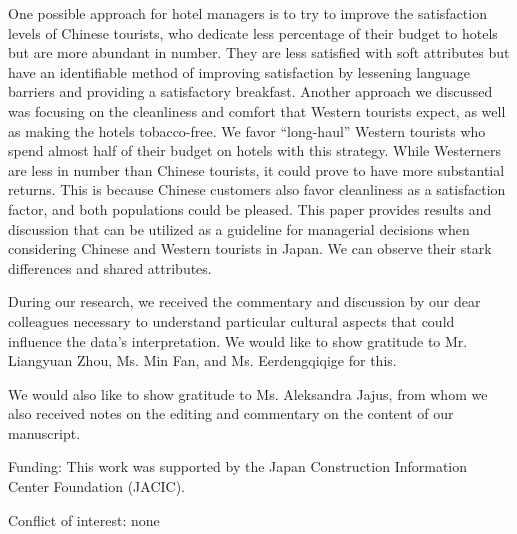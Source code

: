 \documentclass[smallextended,natbib]{svjour3}       %
\begin{document}
  One possible approach for hotel managers is to try to improve the satisfaction levels of Chinese tourists, who dedicate less percentage of their budget to hotels but are more abundant in number. They are less satisfied with soft attributes but have an identifiable method of improving satisfaction by lessening language barriers and providing a satisfactory breakfast. Another approach we discussed was focusing on the cleanliness and comfort that Western tourists expect, as well as making the hotels tobacco-free. We favor ``long-haul'' Western tourists who spend almost half of their budget on hotels with this strategy. While Westerners are less in number than Chinese tourists, it could prove to have more substantial returns. This is because Chinese customers also favor cleanliness as a satisfaction factor, and both populations could be pleased. This paper provides results and discussion that can be utilized as a guideline for managerial decisions when considering Chinese and Western tourists in Japan. We can observe their stark differences and shared attributes. 

\begin{acknowledgements}

  During our research, we received the commentary and discussion by our dear colleagues necessary to understand particular cultural aspects that could influence the data's interpretation. We would like to show gratitude to Mr. Liangyuan Zhou, Ms. Min Fan, and Ms. Eerdengqiqige for this.

  We would also like to show gratitude to Ms. Aleksandra Jajus, from whom we also received notes on the editing and commentary on the content of our manuscript.

  \medskip

  Funding: This work was supported by the Japan Construction Information Center Foundation (JACIC).

  \medskip

  Conflict of interest: none

\end{acknowledgements}



\end{document}
